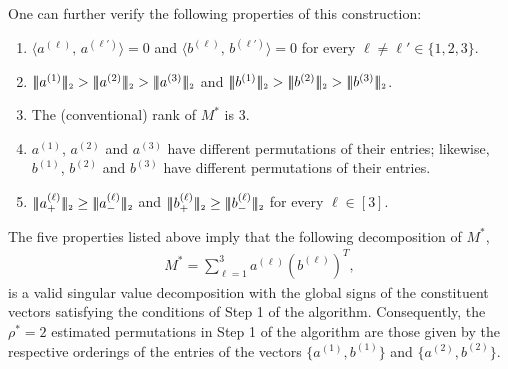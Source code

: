 \documentclass[11pt, hidelinks]{article} %
\newcommand{\matsnorm}[2]{|\!|\!| #1 | \! | \!|_{{#2}}}
\newcommand{\Lnorm}[2]{\ensuremath{\matsnorm{#1}{\mbox{\tiny{#2}}}}}
\newcommand{\inprod}[2]{\ensuremath{\langle #1 , \, #2 \rangle}}
\newcommand{\wtmatrix}{M}
\newcommand{\wtstar}{\wtmatrix^*}
\newcommand{\permrank}{\rho}
\newcommand{\leftvec}{a}
\newcommand{\rightvec}{b}
\newcommand{\permstar}{\permrank^*}
\newcommand{\subveclength}{\nu}
\begin{document}
One can further verify the following properties of this construction:
\begin{enumerate}
\item $\inprod{\leftvec^{(\ell)} }{\leftvec^{(\ell')}} = 0$ and $\inprod{\rightvec^{(\ell)}
}{\rightvec^{(\ell')}} = 0$ for every $\ell \neq \ell' \in
  \{1,2,3\}$.\label{PropNegativeConstructionOrthogonal}
\item $\Lnorm{\leftvec^{(1)}}{2} > \Lnorm{\leftvec^{(2)}}{2}> \Lnorm{\leftvec^{(3)}}{2}$
  and $\Lnorm{\rightvec^{(1)}}{2} > \Lnorm{\rightvec^{(2)}}{2} >
  \Lnorm{\rightvec^{(3)}}{2}$.\label{PropNegativeConstructionMaxVec}
\item The (conventional) rank of $\wtstar$ is
  $3$.\label{PropNegativeConstructionRanks}
\item $\leftvec^{(1)}$, $\leftvec^{(2)}$ and $\leftvec^{(3)}$ have different permutations
  of their entries; likewise, $\rightvec^{(1)}$, $\rightvec^{(2)}$ and $\rightvec^{(3)}$ have
  different permutations of their
  entries.\label{PropNegativeConstructionDiffPerm}
  \item $\Lnorm{\leftvec^{(\ell)}_+}{2} \geq \Lnorm{\leftvec^{(\ell)}_-}{2}$ and $\Lnorm{\rightvec^{(\ell)}_+}{2} \geq \Lnorm{\rightvec^{(\ell)}_-}{2}$ for every $\ell \in [3]$. \label{ProfNegativeConstructionSign}
\end{enumerate}

The five properties listed above imply that the following decomposition of $\wtstar$,
\begin{align*}
\wtstar = \sum_{\ell=1}^{3} \leftvec^{(\ell)} (\rightvec^{(\ell)})^T,
\end{align*}
is a valid singular value decomposition with the global signs of the constituent vectors satisfying the conditions of Step 1 of the
algorithm. Consequently, the $\permstar = 2$ estimated permutations in
Step 1 of the algorithm are those given by the respective orderings of the entries of the vectors $\{\leftvec^{(1)},\rightvec^{(1)}\}$ and
$\{\leftvec^{(2)},\rightvec^{(2)}\}$.
\end{document}
